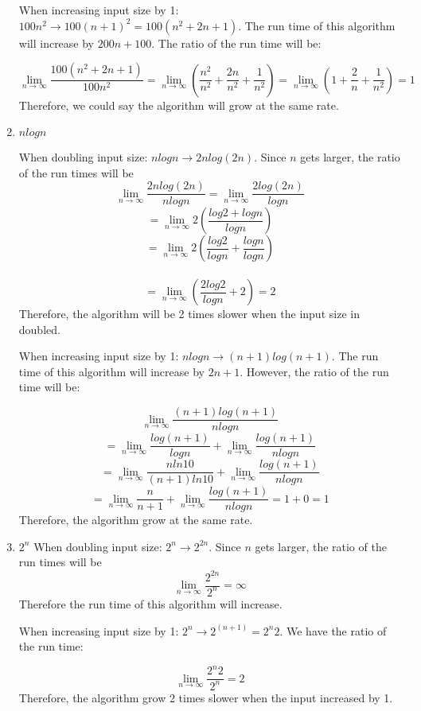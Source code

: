 \documentclass{cpsc413Solutions}
\begin{document}
\begin{problemlist}
\begin{problem}
\begin{answer}
\begin{enumerate}
When increasing input size by 1: $100n^2 \xrightarrow{} 100(n+1)^2 = 100(n^2 + 2n + 1)$.
The run time of this algorithm will increase by $200n+100$. The ratio of the run time will be:

$$\lim_{n \to \infty} \frac{100(n^2 + 2n +1)}{100n^2} = \lim_{n \to \infty} (\frac{n^2}{n^2} + \frac{2n}{n^2} + \frac{1}{n^2}) = \lim_{n\to\infty} (1+\frac{2}{n} + \frac{1}{n^2}) = 1$$
Therefore, we could say the algorithm will grow at the same rate.

\item $nlogn$

When doubling input size: $nlogn \xrightarrow{} 2n log(2n)$. 
Since $n$ gets larger, the ratio of the run times will be $$\lim_{n\to\infty}\frac{2n log(2n)}{nlogn} = \lim_{n\to\infty} \frac{2log(2n)}{logn}$$
$$= \lim_{n\to\infty} 2 ( \frac{log2+logn}{logn}) $$
$$=\lim_{n\to\infty} 2 (\frac{log2}{logn} + \frac{logn}{logn}) $$ \\
$$= \lim_{n\to\infty} (\frac{2log2}{logn}+2 ) = 2$$
Therefore, the algorithm will be 2 times slower when the input size in doubled.


When increasing input size by 1: $nlogn \xrightarrow{} (n+1)log(n+1) $.
The run time of this algorithm will increase by $2n+1$. However, the ratio of the run time will be:

$$\lim_{n \to \infty} \frac{(n+1)log(n+1)}{nlogn} $$
$$= \lim_{n \to \infty} \frac{log(n+1)}{logn} + \lim_{n\to\infty} \frac{log(n+1)}{nlogn} $$
$$= \lim_{n\to\infty} \frac{nln10}{(n+1)ln10} + \lim_{n\to\infty}\frac{log(n+1)}{nlogn} $$
$$= \lim_{n\to\infty} \frac{n}{n+1}+ \lim_{n\to\infty} \frac{log(n+1)}{nlogn} = 1+0 =1 $$
Therefore, the algorithm grow at the same rate.

\item $2^n$
When doubling input size: $2^n \xrightarrow{} 2^{2n}$. 
Since $n$ gets larger, the ratio of the run times will be $$\lim_{n\to\infty}\frac{2^{2n}}{2^n} = \infty $$ Therefore the run time of this algorithm will increase.

When increasing input size by 1: $2^n \xrightarrow{} 2^{(n+1)} = 2^n 2$.
We have the ratio of the run time:

$$\lim_{n \to \infty} \frac{2^n 2}{2^n} = 2$$
Therefore, the algorithm grow 2 times slower when the input increased by 1.

\end{enumerate}
\end{answer}
\end{problem}



\end{problemlist}
\end{document}

